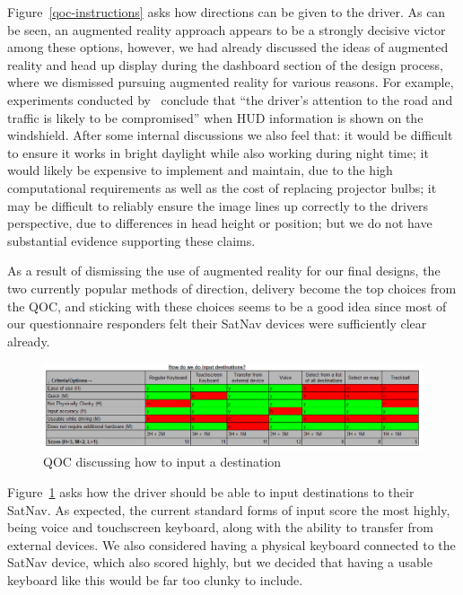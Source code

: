 \documentclass{article}
\begin{document}
Figure~\ref{qoc-instructions} asks how directions can be given to the driver. As can be seen, an augmented reality approach appears to be a strongly decisive victor among these options, however, we had already discussed the ideas of augmented reality and head up display during the dashboard section of the design process, where we dismissed pursuing augmented reality for various reasons. For example, experiments conducted by~\cite{augmented-reality} conclude that ``the driver's attention to the road and traffic is likely to be compromised'' when HUD information is shown on the windshield. After some internal discussions we also feel that: it would be difficult to ensure it works in bright daylight while also working during night time; it would likely be expensive to implement and maintain, due to the high computational requirements as well as the cost of replacing projector bulbs; it may be difficult to reliably ensure the image lines up correctly to the drivers perspective, due to differences in head height or position; but we do not have substantial evidence supporting these claims.

As a result of dismissing the use of augmented reality for our final designs, the two currently popular methods of direction, delivery become the top choices from the QOC, and sticking with these choices seems to be a good idea since most of our questionnaire responders felt their SatNav devices were sufficiently clear already.

\begin{figure}[H]
  \centering
  \includegraphics[width=\linewidth]{qoc-nav-input}
  \caption{QOC discussing how to input a destination}\label{qoc-input}
\end{figure}

Figure~\ref{qoc-input} asks how the driver should be able to input destinations to their SatNav. As expected, the current standard forms of input score the most highly, being voice and touchscreen keyboard, along with the ability to transfer from external devices. We also considered having a physical keyboard connected to the SatNav device, which also scored highly, but we decided that having a usable keyboard like this would be far too clunky to include.
\end{document}
